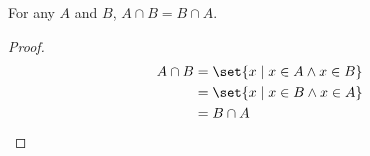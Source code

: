 \guard



\begin{prop}
\label{prop:intersectionIsCommutative}
  For any $A$ and $B$, $A\cap B = B\cap A$.
\end{prop}
\begin{proof}
  \begin{align*}
    A\cap B &= \set{ x\mid x\in A \wedge x\in B } \\
            &= \set{ x\mid x\in B \wedge x\in A } \\
            &= B\cap A
  \end{align*}
\end{proof}
